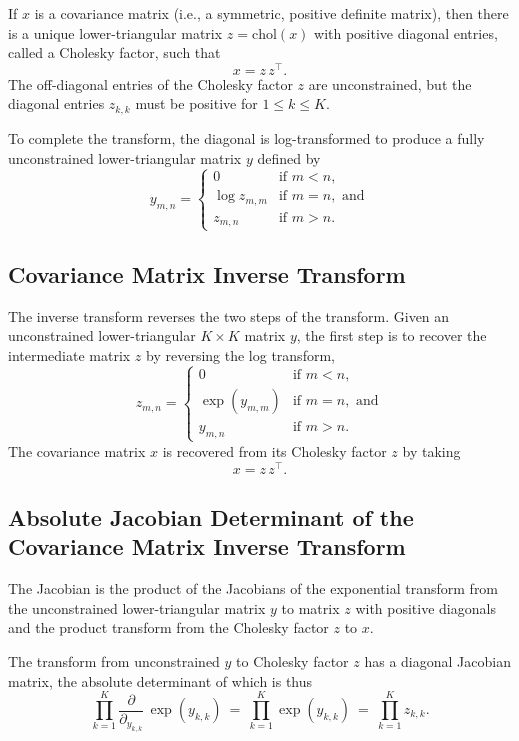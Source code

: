 If $x$ is a covariance matrix (i.e., a symmetric, positive definite
matrix), then there is a unique lower-triangular matrix $z =
\mbox{chol}(x)$ with positive diagonal entries, called a Cholesky
factor, such that
\[
x = z \, z^{\top}.
\]
The off-diagonal entries of the Cholesky factor $z$ are unconstrained,
but the diagonal entries $z_{k,k}$ must be positive for $1 \leq k
\leq K$.

To complete the transform, the diagonal is log-transformed to produce
a fully unconstrained lower-triangular matrix $y$ defined by
\[
y_{m,n} = 
\left\{
\begin{array}{cl}
0 & \mbox{if } m < n,
\\[4pt]
\log z_{m,m} & \mbox{if } m = n, \mbox{ and}
\\[4pt]
z_{m,n} & \mbox{if } m > n.
\end{array}
\right.
\]

\subsection{Covariance Matrix Inverse Transform}

The inverse transform reverses the two steps of the transform.
Given an unconstrained lower-triangular $K \times K$ matrix $y$, the
first step is to recover the intermediate matrix $z$ by reversing the
log transform,
\[
z_{m,n} = 
\left\{
\begin{array}{cl}
0 & \mbox{if } m < n,
\\[4pt]
\exp(y_{m,m}) & \mbox{if } m = n, \mbox{ and}
\\[4pt]
y_{m,n} & \mbox{if } m > n.
\end{array}
\right.
\]
%
The covariance matrix $x$ is recovered from its Cholesky factor $z$ by
taking
%
\[
x = z \, z^{\top}.
\]

\subsection{Absolute Jacobian Determinant of the Covariance
  Matrix Inverse Transform}

The Jacobian is the product of the Jacobians of the exponential
transform from the unconstrained lower-triangular matrix $y$ to matrix
$z$ with positive diagonals and the product transform from the
Cholesky factor $z$ to $x$.

The transform from unconstrained $y$ to Cholesky factor $z$ has a
diagonal Jacobian matrix, the absolute determinant of which is thus
%
\[
\prod_{k=1}^K  \frac{\partial}{\partial_{y_{k,k}}} \, \exp(y_{k,k})
\ = \ 
\prod_{k=1}^K \exp(y_{k,k})
\ = \
\prod_{k=1}^K z_{k,k}.
\]

